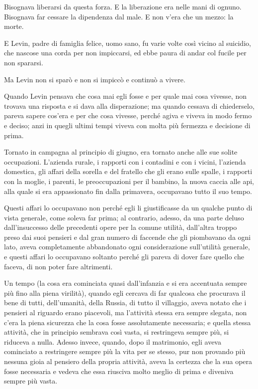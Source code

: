 Bisognava liberarsi da questa forza. E la liberazione era nelle mani di ognuno. Bisognava far cessare la dipendenza dal male. E non v'era che un mezzo: la morte. 

E Levin, padre di famiglia felice, uomo sano, fu varie volte così vicino al suicidio, che nascose una corda per non impiccarsi, ed ebbe paura di andar col fucile per non spararsi. 

Ma Levin non si sparò e non si impiccò e continuò a vivere. 

\label{x-7} 

Quando Levin pensava che cosa mai egli fosse e per quale mai cosa vivesse, non trovava una risposta e si dava alla disperazione; ma quando cessava di chiederselo, pareva sapere cos'era e per che cosa vivesse, perché agiva e viveva in modo fermo e deciso; anzi in quegli ultimi tempi viveva con molta più fermezza e decisione di prima. 

Tornato in campagna al principio di giugno, era tornato anche alle sue solite occupazioni. L'azienda rurale, i rapporti con i contadini e con i vicini, l'azienda domestica, gli affari della sorella e del fratello che gli erano sulle spalle, i rapporti con la moglie, i parenti, le preoccupazioni per il bambino, la nuova caccia alle api, alla quale si era appassionato fin dalla primavera, occupavano tutto il suo tempo. 

Questi affari lo occupavano non perché egli li giustificasse da un qualche punto di vista generale, come soleva far prima; al contrario, adesso, da una parte deluso dall'insuccesso delle precedenti opere per la comune utilità, dall'altra troppo preso dai suoi pensieri e dal gran numero di faccende che gli piombavano da ogni lato, aveva completamente abbandonato ogni considerazione sull'utilità generale, e questi affari lo occupavano soltanto perché gli pareva di dover fare quello che faceva, di non poter fare altrimenti. 

Un tempo (la cosa era cominciata quasi dall'infanzia e si era accentuata sempre più fino alla piena virilità), quando egli cercava di far qualcosa che procurava il bene di tutti, dell'umanità, della Russia, di tutto il villaggio, aveva notato che i pensieri al riguardo erano piacevoli, ma l'attività stessa era sempre slegata, non c'era la piena sicurezza che la cosa fosse assolutamente necessaria; e quella stessa attività, che in principio sembrava così vasta, si restringeva sempre più, si riduceva a nulla. Adesso invece, quando, dopo il matrimonio, egli aveva cominciato a restringere sempre più la vita per se stesso, pur non provando più nessuna gioia al pensiero della propria attività, aveva la certezza che la sua opera fosse necessaria e vedeva che essa riusciva molto meglio di prima e diveniva sempre più vasta. 

